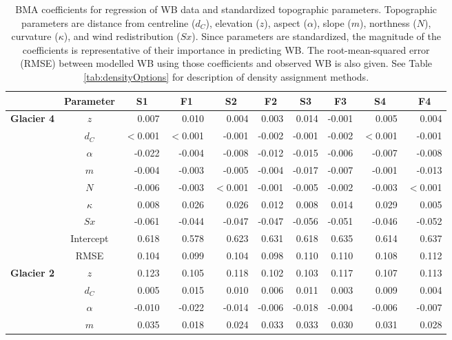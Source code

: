 \documentclass{sfuthesis}
\newcommand{\params}{Topographic parameters are distance from centreline ($d_C$), elevation ($z$), aspect ($\alpha$), slope ($m$), northness ($N$), curvature ($\kappa$), and wind redistribution ($Sx$). }
\begin{document}
\begin{table}
\footnotesize
\centering
\caption{BMA coefficients for regression of WB data and standardized topographic parameters. \params  Since parameters are standardized, the magnitude of the coefficients is representative of their importance in predicting WB. The root-mean-squared error (RMSE) between modelled WB using those coefficients and observed WB is also given. See Table \ref{tab:densityOptions} for description of density assignment methods.}
\label{tab:BMAcoeffFull}
\begin{tabular}{ccrrrrrrrr}
\textbf{} & \textbf{Parameter} & \multicolumn{1}{c}{\textbf{S1}} & \multicolumn{1}{c}{\textbf{F1}} & \multicolumn{1}{c}{\textbf{S2}} & \multicolumn{1}{c}{\textbf{F2}} & \multicolumn{1}{c}{\textbf{S3}} & \multicolumn{1}{c}{\textbf{F3}} & \multicolumn{1}{c}{\textbf{S4}} & \multicolumn{1}{c}{\textbf{F4}} \\ \hline \hline
\multirow{9}{*}{\textbf{Glacier 4}} & $z$ & 0.007 & 0.010 & 0.004 & 0.003 & 0.014 & -0.001 & 0.005 & 0.004 \\
 & $d_C$ & $<$0.001 & $<$0.001 & -0.001 & -0.002 & -0.001 & -0.002 & $<$0.001 & -0.001 \\
 & $\alpha$ & -0.022 & -0.004 & -0.008 & -0.012 & -0.015 & -0.006 & -0.007 & -0.008 \\
 & $m$ & -0.004 & -0.003 & -0.005 & -0.004 & -0.017 & -0.007 & -0.001 & -0.013 \\
 & $N$ & -0.006 & -0.003 & $<$0.001 & -0.001 & -0.005 & -0.002 & -0.003 & $<$0.001 \\
 & $\kappa$ & 0.008 & 0.026 & 0.026 & 0.012 & 0.008 & 0.014 & 0.029 & 0.005 \\
 & $Sx$ & -0.061 & -0.044 & -0.047 & -0.047 & -0.056 & -0.051 & -0.046 & -0.052 \\
 & Intercept & 0.618 & 0.578 & 0.623 & 0.631 & 0.618 & 0.635 & 0.614 & 0.637 \\
 & RMSE & 0.104 & 0.099 & 0.104 & 0.098 & 0.110 & 0.110 & 0.108 & 0.112 \\ \hline
\multirow{9}{*}{\textbf{Glacier 2}} & $z$ & 0.123 & 0.105 & 0.118 & 0.102 & 0.103 & 0.117 & 0.107 & 0.113 \\
 & $d_C$ & 0.005 & 0.015 & 0.010 & 0.006 & 0.011 & 0.003 & 0.009 & 0.004 \\
 & $\alpha$ & -0.010 & -0.022 & -0.014 & -0.006 & -0.018 & -0.004 & -0.006 & -0.007 \\
 & $m$ & 0.035 & 0.018 & 0.024 & 0.033 & 0.033 & 0.030 & 0.031 & 0.028 \\

\end{tabular}
\end{table}
\end{document}
